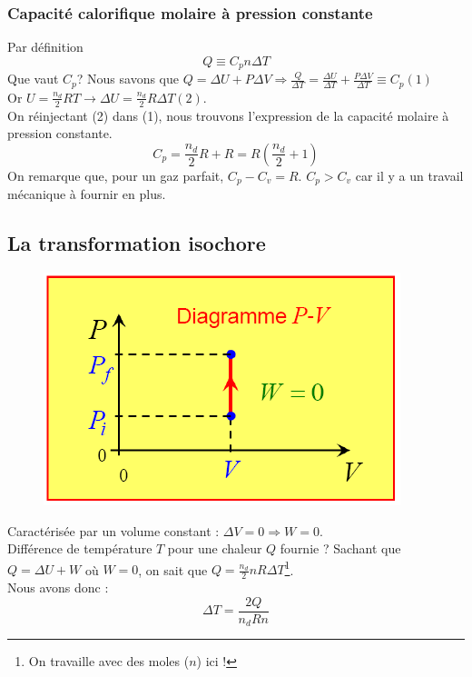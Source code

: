 \documentclass	[11pt, a4paper, openany]{book}
\begin{document}
\subsubsection{Capacité calorifique molaire à pression constante}
Par définition 
\begin{equation}
	Q \equiv C_p n \Delta T
\end{equation}
Que vaut $C_p$? Nous savons que $Q = \Delta U + P\Delta V \Rightarrow \frac{Q}{\Delta T} = \frac{\Delta U}{\Delta T} + \frac{P\Delta V}{\Delta T} \equiv C_p (1)$\\
Or $U = \frac{n_d}{2}RT \rightarrow \Delta U = \frac{n_d}{2}R\Delta T (2)$.\\
On réinjectant (2) dans (1), nous trouvons l'expression de la capacité molaire à pression constante.
\begin{equation}
	C_p = \frac{n_d}{2}R + R = R(\frac{n_d}{2}+1)
\end{equation}
On remarque que, pour un gaz parfait, $C_p - C_v = R$. $C_p > C_v$ car il y a un travail mécanique à fournir en plus.


\subsection{La transformation isochore}
\begin{figure}
	\includegraphics[scale=0.24]{th/image11.png}
\end{figure}
Caractérisée par un volume constant : $\Delta V = 0 \Rightarrow W = 0$.\\
Différence de température $T$ pour une chaleur $Q$ fournie ? Sachant que $Q = \Delta U + W$ où $W = 0$, on sait que $Q = \frac{n_d}{2}nR\Delta T$\footnote{On travaille avec des moles ($n$) ici !}.\\Nous avons donc :
\begin{equation}
	\Delta T = \frac{2Q}{n_d Rn}
\end{equation}
\end{document}
